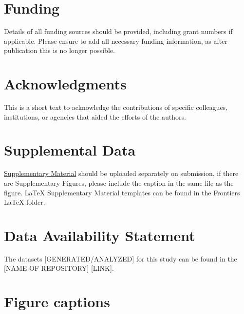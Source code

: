 \documentclass[utf8]{FrontiersinHarvard} %
\begin{document}
\section*{Funding}
Details of all funding sources should be provided, including grant numbers if applicable. Please ensure to add all necessary funding information, as after publication this is no longer possible.

\section*{Acknowledgments}
This is a short text to acknowledge the contributions of specific colleagues, institutions, or agencies that aided the efforts of the authors.

\section*{Supplemental Data}
 \href{http://home.frontiersin.org/about/author-guidelines#SupplementaryMaterial}{Supplementary Material} should be uploaded separately on submission, if there are Supplementary Figures, please include the caption in the same file as the figure. LaTeX Supplementary Material templates can be found in the Frontiers LaTeX folder.

\section*{Data Availability Statement}
The datasets [GENERATED/ANALYZED] for this study can be found in the [NAME OF REPOSITORY] [LINK].





\section*{Figure captions}

\end{document}
